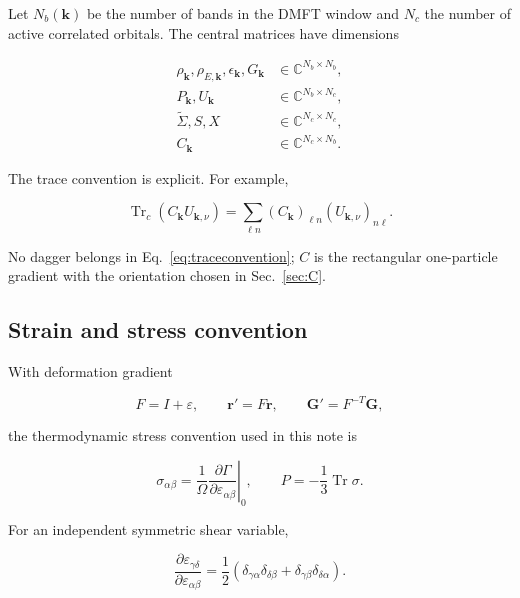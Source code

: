 \documentclass[11pt]{article}
\numberwithin{equation}{section}
\newcommand{\Tr}{\operatorname{Tr}}
\newcommand{\kb}{\mathbf k}
\newcommand{\Sig}{\widetilde\Sigma}
\begin{document}
Let $N_b(\kb)$ be the number of bands in the DMFT window and $N_c$ the number
of active correlated orbitals.  The central matrices have dimensions

\begin{align}
 \rho_{\kb},\rho_{E,\kb},\epsilon_{\kb},G_{\kb} &\in
     \mathbb C^{N_b\times N_b},\\
 P_{\kb},U_{\kb} &\in \mathbb C^{N_b\times N_c},\\
 \Sig, S, X &\in \mathbb C^{N_c\times N_c},\\
 C_{\kb}&\in\mathbb C^{N_c\times N_b}.
\end{align}

The trace convention is explicit.  For example,

\begin{equation}
 \Tr_c(C_{\kb}U_{\kb,\nu})
 =\sum_{\ell n}(C_{\kb})_{\ell n}(U_{\kb,\nu})_{n\ell}.
 \label{eq:traceconvention}
\end{equation}

No dagger belongs in Eq.~\eqref{eq:traceconvention}; $C$ is the rectangular
one-particle gradient with the orientation chosen in Sec.~\ref{sec:C}.

\subsection{Strain and stress convention}

With deformation gradient

\begin{equation}
 F=I+\varepsilon,\qquad \mathbf r'=F\mathbf r,
 \qquad \mathbf G'=F^{-T}\mathbf G,
\end{equation}

the thermodynamic stress convention used in this note is

\begin{equation}
 \sigma_{\alpha\beta}=\frac{1}{\Omega}
 \left.\frac{\partial\Gamma}{\partial\varepsilon_{\alpha\beta}}\right|_0,
 \qquad P=-\frac13\Tr\sigma.
 \label{eq:stressdef}
\end{equation}

For an independent symmetric shear variable,

\begin{equation}
 \frac{\partial\varepsilon_{\gamma\delta}}
 {\partial\varepsilon_{\alpha\beta}}
 =\frac12(\delta_{\gamma\alpha}\delta_{\delta\beta}
          +\delta_{\gamma\beta}\delta_{\delta\alpha}).
\end{equation}
\end{document}
